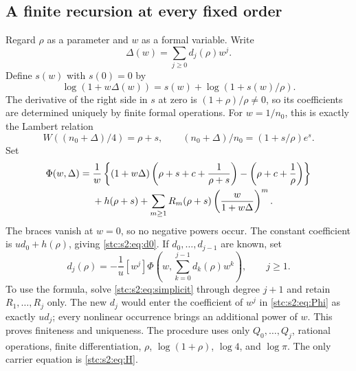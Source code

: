 \documentclass[11pt,letterpaper]{article}
\numberwithin{equation}{section}
\theoremstyle{remark}\newtheorem{remark}[theorem]{Remark}
\begin{document}
\subsection{A finite recursion at every fixed order}\label{stc:s2:sec:inverse-recursion}
Regard $\rho$ as a parameter and $w$ as a formal variable. Write
\begin{equation}\label{stc:s2:eq:Delta}
 \Delta(w)=\sum_{j\ge0}d_j(\rho)w^j.
\end{equation}
Define $s(w)$ with $s(0)=0$ by
\begin{equation}\label{stc:s2:eq:simplicit}
 \log(1+w\Delta(w))=s(w)+\log(1+s(w)/\rho).
\end{equation}
The derivative of the right side in $s$ at zero is $(1+\rho)/\rho\ne0$, so its coefficients are determined uniquely by finite formal operations. For $w=1/n_0$, this is exactly the Lambert relation
\[
 W((n_0+\Delta)/4)=\rho+s,
 \qquad (n_0+\Delta)/n_0=(1+s/\rho)e^s.
\]
Set
\begin{align}
 \Phi(w,\Delta)={}&\frac1w\left\{
 (1+w\Delta)\left(\rho+s+c+\frac1{\rho+s}\right)
 -\left(\rho+c+\frac1\rho\right)\right\}\notag\\
 &+h(\rho+s)+\sum_{m\ge1}R_m(\rho+s)
 \left(\frac w{1+w\Delta}\right)^m.\label{stc:s2:eq:Phi}
\end{align}
The braces vanish at $w=0$, so no negative powers occur. The constant coefficient is $ud_0+h(\rho)$, giving \eqref{stc:s2:eq:d0}. If $d_0,\ldots,d_{j-1}$ are known, set
\begin{equation}\label{stc:s2:eq:drecursion}
 d_j(\rho)=-\frac1u[w^j]\Phi\left(w,\sum_{k=0}^{j-1}d_k(\rho)w^k\right),\qquad j\ge1.
\end{equation}
To use the formula, solve \eqref{stc:s2:eq:simplicit} through degree $j+1$ and retain $R_1,\ldots,R_j$ only. The new $d_j$ would enter the coefficient of $w^j$ in \eqref{stc:s2:eq:Phi} as exactly $ud_j$; every nonlinear occurrence brings an additional power of $w$. This proves finiteness and uniqueness. The procedure uses only $Q_0,\ldots,Q_j$, rational operations, finite differentiation, $\rho$, $\log(1+\rho)$, $\log4$, and $\log\pi$. The only carrier equation is \eqref{stc:s2:eq:H}.
\end{document}
